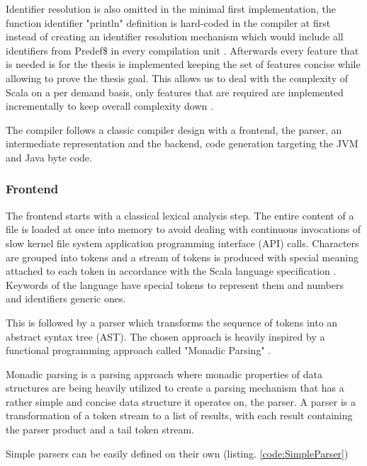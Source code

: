 \documentclass{VUMIFPSbakalaurinis}
\begin{document}
Identifier resolution is also omitted in the minimal first implementation, the function identifier "println" definition is hard-coded in the compiler at first instead of creating an identifier resolution mechanism which would include all identifiers from Predef\$ in every compilation unit \cite{Predef}.
Afterwards every feature that is needed is for the thesis is implemented keeping the set of features concise while allowing to prove the thesis goal.
This allows us to deal with the complexity of Scala on a per demand basis, only features that are required are implemented incrementally to keep overall complexity down \cite{IncrementalCompiler}.

The compiler follows a classic compiler design with a frontend, the parser, an intermediate representation and the backend, code generation targeting the JVM and Java byte code.

\subsubsection{Frontend}

The frontend starts with a classical lexical analysis step.
The entire content of a file is loaded at once into memory to avoid dealing with continuous invocations of slow kernel file system application programming interface (API) calls.
Characters are grouped into tokens and a stream of tokens is produced with special meaning attached to each token in accordance with the Scala language specification \cite{ScalaSpec}.
Keywords of the language have special tokens to represent them and numbers and identifiers generic ones.

This is followed by a parser which transforms the sequence of tokens into an abstract syntax tree (AST).
The chosen approach is heavily inspired by a functional programming approach called "Monadic Parsing" \cite{MonadicParsing}.

Monadic parsing is a parsing approach where monadic properties of data structures are being heavily utilized to create a parsing mechanism that has a rather simple and concise data structure it operates on, the parser.
A parser is a transformation of a token stream to a list of results, with each result containing the parser product and a tail token stream.

Simple parsers can be easily defined on their own (listing. \ref{code:SimpleParser})

\end{document}
